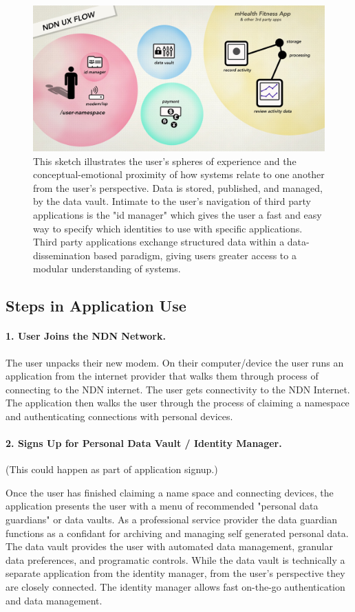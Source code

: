 \begin{figure}
\begin{center}
\includegraphics[width=.5\textwidth]{figures/ux-scenario}
\caption{This sketch illustrates the user's spheres of experience and the conceptual-emotional proximity of how systems relate to one another from the user's perspective. Data is stored, published, and managed, by the data vault. Intimate to the user's navigation of third party applications is the "id manager" which gives the user a fast and easy way to specify which identities to use with specific applications. Third party applications exchange structured data within a data-dissemination based paradigm, giving users greater access to a modular understanding of systems.}
\label{fig:uxsketch}
\end{center}
\end{figure}

\subsection{Steps in Application Use} 

\paragraph*{1. User Joins the NDN Network.} 
The user unpacks their new modem. On their computer/device the user runs an application from the internet provider that walks them through process of connecting to the NDN internet. The user gets connectivity to the NDN Internet. The application then walks the user through the process of claiming a namespace and authenticating connections with personal devices. 
   
\paragraph*{2. Signs Up for Personal Data Vault / Identity Manager.}

(This could happen as part of application signup.)

Once the user has finished claiming a name space and connecting devices, the application presents the user with a menu of recommended "personal data guardians" or data vaults. As a professional service provider the data guardian functions as a confidant for archiving and managing self generated personal data. The data vault provides the user with automated data management, granular data preferences, and programatic controls. While the data vault is technically a separate application from the identity manager, from the user's perspective they are closely connected. The identity manager allows fast on-the-go authentication and data management. 

